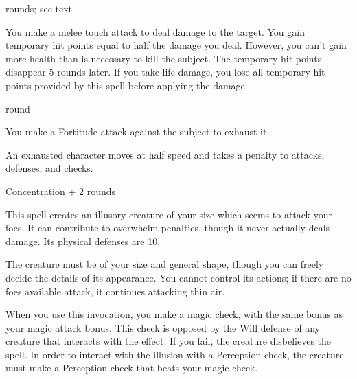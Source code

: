  rounds; see text
\begin{spelleffect}
    You make a melee touch attack to deal damage to the target. You gain temporary hit points equal to half the damage you deal. However, you can't gain more health than is necessary to kill the subject. The temporary hit points disappear 5 rounds later. If you take life damage, you lose all temporary hit points provided by this spell before applying the damage.
\end{spelleffect}

 round
\begin{spelleffect}
    You make a Fortitude attack against the subject to exhaust it.
\end{spelleffect}
\begin{spellnotes}
    An exhausted character moves at half speed and takes a  penalty to attacks, defenses, and checks.
\end{spellnotes}

\spellrng{\rngmed}
\spelldur Concentration + 2 rounds
\begin{spelleffect}
    This spell creates an illusory creature of your size which seems to attack your foes. It can contribute to overwhelm penalties, though it never actually deals damage. Its physical defenses are 10.

    The creature must be of your size and general shape, though you can freely decide the details of its appearance. You cannot control its actions; if there are no foes available attack, it continues attacking thin air.
\end{spelleffect}
\begin{spellnotes}
    When you use this invocation, you make a magic check, with the same bonus as your magic attack bonus. This check is opposed by the Will defense of any creature that interacts with the effect. If you fail, the creature disbelieves the spell. In order to interact with the illusion with a Perception check, the creature must make a Perception check that beats your magic check.
\end{spellnotes}

